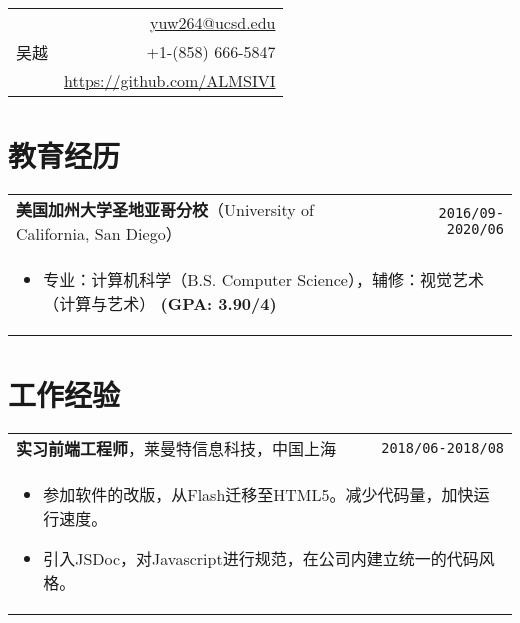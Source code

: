 \documentclass[UTF8]{ctexart}
\newcommand{\itemcols}[1]{
	\multicolumn{2}{p{\dimexpr \linewidth-2\tabcolsep}}{
		\begin{itemize}
			#1
		\end{itemize}
	}
}
\begin{document}
	\noindent
	\begin{tabularx}{\linewidth}{X r}
		\multirow{3}{*}{{\fontsize{40}{50}\selectfont 吴越}}
		& \href{mailto:yuw264@ucsd.edu}{yuw264@ucsd.edu} \\
		& +1-(858) 666-5847 \\
		& \href{https://github.com/ALMSIVI}{https://github.com/ALMSIVI}
	\end{tabularx}
	
	
	\begin{comment}
	\noindent
	\textbf{寻求2019年6-9月软件工程方面的实习。}
	\end{comment}
	
	\begin{comment}
	\begin{tabularx}{\linewidth}{X r}
	\multirow{5}{*}{{\fontsize{45}{60}\selectfont 吴越}} 
	& \href{mailto:yuw264@ucsd.edu}{yuw264@ucsd.edu} \\
	& +1-(858) 666-5847 \\
	& 8840 Costa Verde Blvd. Apt. 3322 \\
	& San Diego, CA 92122
	& United States
	\end{tabularx}
	\end{comment}
	
	
	\section{教育经历}
	\smallskip
	\noindent
	\begin{tabularx}{\linewidth}{X r}
		\textbf{\large 美国加州大学圣地亚哥分校}（University of California, San Diego） & \texttt{2016/09-2020/06} \\
		\itemcols {
			\item 专业：计算机科学（B.S. Computer Science），辅修：视觉艺术（计算与艺术） \textbf{(GPA: 3.90/4)
		}
	}
	\end{tabularx}
	
	
	\section{工作经验}
	\smallskip
	\noindent
	\begin{tabularx}{\textwidth}{X r}
		\textbf{\large 实习前端工程师}，莱曼特信息科技，中国上海 & \texttt{2018/06-2018/08} \\
		\itemcols{
			\item 参加软件的改版，从Flash迁移至HTML5。减少代码量，加快运行速度。
			\item 引入JSDoc，对Javascript进行规范，在公司内建立统一的代码风格。
		} 
	\end{tabularx}
	
\end{document}
